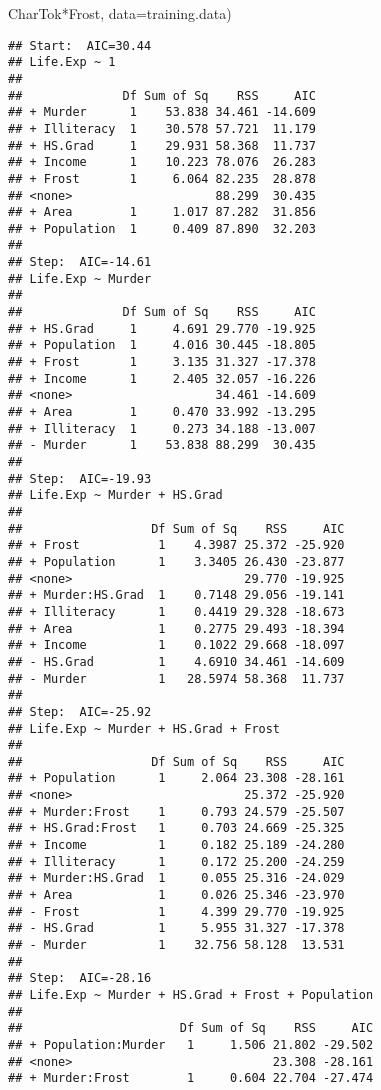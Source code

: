 \documentclass[
]{article}
\newenvironment{Shaded}{\begin{snugshade}}{\end{snugshade}}
\newcommand{\AttributeTok}[1]{\textcolor[rgb]{0.77,0.63,0.00}{#1}}
\newcommand{\NormalTok}[1]{#1}
\begin{document}
\begin{Shaded}
\begin{Highlighting}[]
CharTok{*}\NormalTok{Frost, }\AttributeTok{data=}\NormalTok{training.data)}
\end{Highlighting}
\end{Shaded}

\begin{verbatim}
## Start:  AIC=30.44
## Life.Exp ~ 1
## 
##              Df Sum of Sq    RSS     AIC
## + Murder      1    53.838 34.461 -14.609
## + Illiteracy  1    30.578 57.721  11.179
## + HS.Grad     1    29.931 58.368  11.737
## + Income      1    10.223 78.076  26.283
## + Frost       1     6.064 82.235  28.878
## <none>                    88.299  30.435
## + Area        1     1.017 87.282  31.856
## + Population  1     0.409 87.890  32.203
## 
## Step:  AIC=-14.61
## Life.Exp ~ Murder
## 
##              Df Sum of Sq    RSS     AIC
## + HS.Grad     1     4.691 29.770 -19.925
## + Population  1     4.016 30.445 -18.805
## + Frost       1     3.135 31.327 -17.378
## + Income      1     2.405 32.057 -16.226
## <none>                    34.461 -14.609
## + Area        1     0.470 33.992 -13.295
## + Illiteracy  1     0.273 34.188 -13.007
## - Murder      1    53.838 88.299  30.435
## 
## Step:  AIC=-19.93
## Life.Exp ~ Murder + HS.Grad
## 
##                  Df Sum of Sq    RSS     AIC
## + Frost           1    4.3987 25.372 -25.920
## + Population      1    3.3405 26.430 -23.877
## <none>                        29.770 -19.925
## + Murder:HS.Grad  1    0.7148 29.056 -19.141
## + Illiteracy      1    0.4419 29.328 -18.673
## + Area            1    0.2775 29.493 -18.394
## + Income          1    0.1022 29.668 -18.097
## - HS.Grad         1    4.6910 34.461 -14.609
## - Murder          1   28.5974 58.368  11.737
## 
## Step:  AIC=-25.92
## Life.Exp ~ Murder + HS.Grad + Frost
## 
##                  Df Sum of Sq    RSS     AIC
## + Population      1     2.064 23.308 -28.161
## <none>                        25.372 -25.920
## + Murder:Frost    1     0.793 24.579 -25.507
## + HS.Grad:Frost   1     0.703 24.669 -25.325
## + Income          1     0.182 25.189 -24.280
## + Illiteracy      1     0.172 25.200 -24.259
## + Murder:HS.Grad  1     0.055 25.316 -24.029
## + Area            1     0.026 25.346 -23.970
## - Frost           1     4.399 29.770 -19.925
## - HS.Grad         1     5.955 31.327 -17.378
## - Murder          1    32.756 58.128  13.531
## 
## Step:  AIC=-28.16
## Life.Exp ~ Murder + HS.Grad + Frost + Population
## 
##                      Df Sum of Sq    RSS     AIC
## + Population:Murder   1     1.506 21.802 -29.502
## <none>                            23.308 -28.161
## + Murder:Frost        1     0.604 22.704 -27.474

\end{verbatim}
\end{document}
